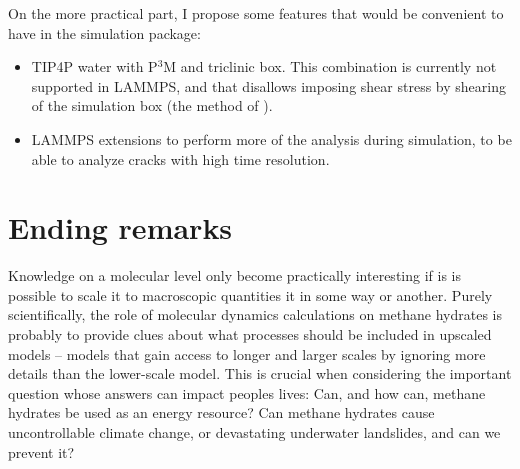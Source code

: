 On the more practical part, I propose some features that would be convenient to have in the simulation package:
\begin{itemize}
\item TIP4P water with P$^3$M and triclinic box. This combination is currently not supported in LAMMPS, and that disallows imposing shear stress by shearing of the simulation box (the method of \citet{Parrinello1981}).
\item LAMMPS extensions to perform more of the analysis during simulation, to be able to analyze cracks with high time resolution.
\end{itemize}
 
\section{Ending remarks}
Knowledge on a molecular level only become practically interesting if is is possible to scale it to macroscopic quantities it in some way or another. Purely scientifically, the role of molecular dynamics calculations on methane hydrates is probably to provide clues about what processes should be included in upscaled models -- models that gain access to longer and larger scales by ignoring more details than the lower-scale model. This is crucial when considering the important question whose answers can impact peoples lives: Can, and how can, methane hydrates be used as an energy resource? Can methane hydrates cause uncontrollable climate change, or devastating underwater landslides, and can we prevent it? 